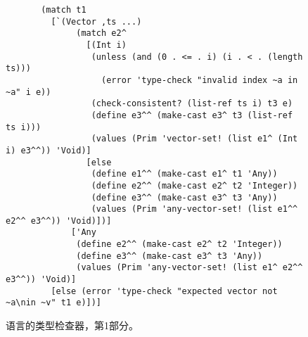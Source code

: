 \documentclass[11pt]{book}
\begin{document}
\begin{figure}[tbp]
\begin{lstlisting}           
	   (match t1
	     [`(Vector ,ts ...)
              (match e2^
                [(Int i)
                 (unless (and (0 . <= . i) (i . < . (length ts)))
                   (error 'type-check "invalid index ~a in ~a" i e))
                 (check-consistent? (list-ref ts i) t3 e)
                 (define e3^^ (make-cast e3^ t3 (list-ref ts i)))
                 (values (Prim 'vector-set! (list e1^ (Int i) e3^^)) 'Void)]
                [else
                 (define e1^^ (make-cast e1^ t1 'Any))
                 (define e2^^ (make-cast e2^ t2 'Integer))
                 (define e3^^ (make-cast e3^ t3 'Any))
                 (values (Prim 'any-vector-set! (list e1^^ e2^^ e3^^)) 'Void)])]
             ['Any
              (define e2^^ (make-cast e2^ t2 'Integer))
              (define e3^^ (make-cast e3^ t3 'Any))
              (values (Prim 'any-vector-set! (list e1^ e2^^ e3^^)) 'Void)]
	     [else (error 'type-check "expected vector not ~a\nin ~v" t1 e)])]
\end{lstlisting}
\caption{ \LangGrad{} 语言的类型检查器，第1部分。}
\label{fig:type-check-Rgradual-1}
\end{figure}
\end{document}
